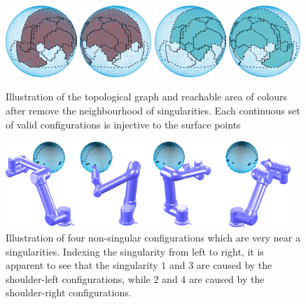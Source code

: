 \documentclass[Afour,sageh,times]{sagej}
\begin{document}
\begin{figure}[t]
\includegraphics[width = 0.24\textwidth]{figures/real_world/color_3_left}
\includegraphics[width = 0.24\textwidth]{figures/real_world/color_3_right}
\includegraphics[width = 0.24\textwidth]{figures/real_world/color_4_left}
\includegraphics[width = 0.24\textwidth]{figures/real_world/color_4_right}
\caption{Illustration of the topological graph and reachable area of colours after remove the neighbourhood of singularities. Each continuous set of valid configurations is injective to the surface points}\label{fig:bijective_graph}
\end{figure}

\begin{figure}[t]
\centering
\includegraphics[width = 0.96\textwidth]{figures/real_world/pose_comb}
\caption{Illustration of four non-singular configurations which are very near a singularities. Indexing the singularity from left to right, it is apparent to see that the singularity $1$ and $3$ are caused by the shoulder-left configurations, while $2$ and $4$ are caused by the shoulder-right configurations.}
\end{figure}
\end{document}
